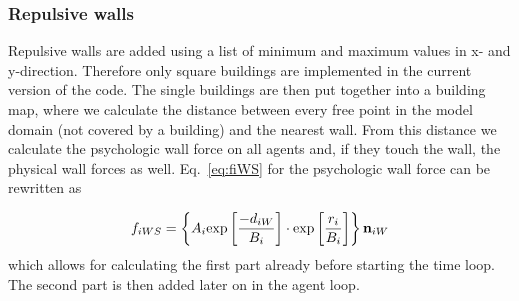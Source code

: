 \documentclass[11pt]{article}
\begin{document}
\subsubsection{Repulsive walls}
\label{sec:WallsImplementation}
Repulsive walls are added using a list of minimum and maximum values in x- and y-direction. Therefore only square buildings are implemented in the current version of the code. The single buildings are then put together into a building map, where we calculate the distance between every free point in the model domain (not covered by a building) and the nearest wall. From this distance we calculate the psychologic wall force on all agents and, if they touch the wall, the physical wall forces as well. Eq.~\eqref{eq:fiWS} for the psychologic wall force can be rewritten as

\begin{equation}
	{f_{iWS}} = \left\{ {{A_i} {\exp \left[ {\frac{{ - {d_{iW}}}}{{{B_i}}}} \right] \cdot \exp \left[ {\frac{{{r_i}}}{{{B_i}}}} \right]} } \right\}{{\bf n}_{iW}}
	\label{eq:fiWS2}
\end{equation}
which allows for calculating the first part already before starting the time loop. The second part is then added later on in the agent loop.
\end{document}
